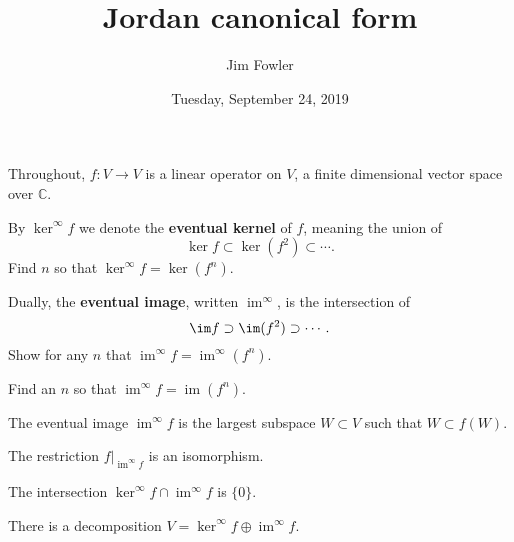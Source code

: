 \documentclass{homework}
\author{Jim Fowler}
\title{Jordan canonical form}
\date{Tuesday, September 24, 2019}
\newcommand{\C}{\mathbb{C}}
\DeclareMathOperator{\image}{im}
\begin{document}
\maketitle

Throughout, $f : V \to V$ is a linear operator on $V$, a finite dimensional vector space over $\C$.


\begin{problem}
  By $\ker^\infty f$ we denote the \textbf{eventual kernel} of $f$, meaning the union of
  \[
    \ker f \subset \ker (f^2) \subset \cdots.
  \]
  Find $n$ so that $\ker^\infty f = \ker (f^n)$.
\end{problem}

\vfill

\begin{problem}
  Dually, the \textbf{eventual image}, written $\image^\infty$, is the intersection of
  \[
    \im f \supset \im (f^2) \supset \cdots.
  \]
  Show for any $n$ that $\image^\infty f = \image^\infty (f^n)$.
\end{problem}

\vfill

\begin{problem}
  Find an $n$ so that $\image^\infty f = \image (f^n)$.
\end{problem}

\vfill

\begin{problem}
  The eventual image $\image^\infty f$ is the largest subspace
  $W \subset V$ such that $W \subset f(W)$.
\end{problem}

% 

\vfill

\begin{problem}
  The restriction $f |_{\image^\infty f}$ is an isomorphism.
\end{problem}

\vfill

\begin{problem}
  The intersection $\ker^\infty f \cap \image^\infty f$ is $\{ 0 \}$.
\end{problem}


\vfill

\begin{problem}
  There is a decomposition $V = \ker^\infty f \oplus \image^\infty f$.
\end{problem}
\end{document}
